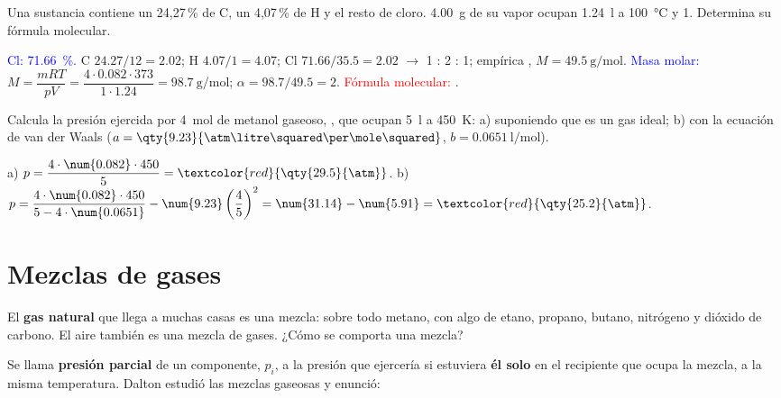 \begin{exercise}
    Una sustancia contiene un 24,27\,\% de C, un 4,07\,\% de H y el resto de cloro. \qty{4.00}{\gram} de su vapor ocupan
    \qty{1.24}{\litre} a \qty{100}{\degreeCelsius} y \qty{1}{\atm}. Determina su fórmula molecular.
    \begin{solu}
        \textcolor{blue}{Cl: \qty{71.66}{\percent}.} C \(\num{24.27}/12 = \num{2.02}\); H \(\num{4.07}/1 = \num{4.07}\);
        Cl \(\num{71.66}/\num{35.5} = \num{2.02}\) \(\rightarrow\) 1 : 2 : 1; empírica , \(M = \qty{49.5}{\gram\per\mole}\).
        \textcolor{blue}{Masa molar:} \(M = \dfrac{m R T}{p V} = \dfrac{4 \cdot \num{0.082} \cdot 373}{1 \cdot \num{1.24}} = \qty{98.7}{\gram\per\mole}\);
        \(\alpha = \num{98.7}/\num{49.5} = 2\). \textcolor{red}{Fórmula molecular: }.
    \end{solu}
\end{exercise}

\begin{exercise}
    Calcula la presión ejercida por \qty{4}{\mole} de metanol gaseoso, , que ocupan \qty{5}{\litre} a \qty{450}{\kelvin}:
    a) suponiendo que es un gas ideal; b) con la ecuación de van der Waals
    (\(a = \qty{9.23}{\atm\litre\squared\per\mole\squared}\), \(b = \qty{0.0651}{\litre\per\mole}\)).
    \begin{solu}
        a) \(p = \dfrac{4 \cdot \num{0.082} \cdot 450}{5} = \textcolor{red}{\qty{29.5}{\atm}}\).
        b) \(p = \dfrac{4 \cdot \num{0.082} \cdot 450}{5 - 4 \cdot \num{0.0651}} - \num{9.23} \left(\dfrac{4}{5}\right)^2 = \num{31.14} - \num{5.91}
        = \textcolor{red}{\qty{25.2}{\atm}}\).
    \end{solu}
\end{exercise}

\section{Mezclas de gases}\label{sec:ud1-mezclas}

El \textbf{gas natural} que llega a muchas casas es una mezcla: sobre todo metano, con algo de etano, propano, butano,
nitrógeno y dióxido de carbono. El aire también es una mezcla de gases. ¿Cómo se comporta una mezcla?

Se llama \textbf{presión parcial} de un componente, \(p_i\), a la presión que ejercería si estuviera \textbf{él solo} en el
recipiente que ocupa la mezcla, a la misma temperatura. Dalton estudió las mezclas gaseosas y enunció:

